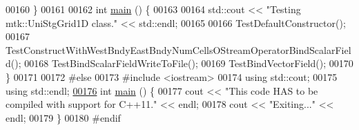 \begin{DoxyCode}
00160 \}
00161 
00162 \textcolor{keywordtype}{int} \hyperlink{mtk__uni__stg__grid__1d__test_8cc_ae66f6b31b5ad750f1fe042a706a4e3d4}{main} () \{
00163 
00164   std::cout << \textcolor{stringliteral}{"Testing mtk::UniStgGrid1D class."} << std::endl;
00165 
00166   TestDefaultConstructor();
00167   TestConstructWithWestBndyEastBndyNumCellsOStreamOperatorBindScalarField();
00168   TestBindScalarFieldWriteToFile();
00169   TestBindVectorField();
00170 \}
00171 
00172 \textcolor{preprocessor}{#else}
00173 \textcolor{preprocessor}{#include <iostream>}
00174 \textcolor{keyword}{using} std::cout;
00175 \textcolor{keyword}{using} std::endl;
\hypertarget{mtk__uni__stg__grid__1d__test_8cc_source_l00176}{}\hyperlink{mtk__uni__stg__grid__1d__test_8cc_ae66f6b31b5ad750f1fe042a706a4e3d4}{00176} \textcolor{keywordtype}{int} \hyperlink{mtk__uni__stg__grid__1d__test_8cc_ae66f6b31b5ad750f1fe042a706a4e3d4}{main} () \{
00177   cout << \textcolor{stringliteral}{"This code HAS to be compiled with support for C++11."} << endl;
00178   cout << \textcolor{stringliteral}{"Exiting..."} << endl;
00179 \}
00180 \textcolor{preprocessor}{#endif}
\end{DoxyCode}
